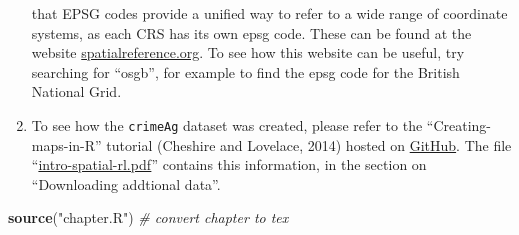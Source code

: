 \documentclass[]{article}
\newenvironment{Shaded}{}{}
\newcommand{\KeywordTok}[1]{\textcolor[rgb]{0.00,0.44,0.13}{\textbf{{#1}}}}
\newcommand{\StringTok}[1]{\textcolor[rgb]{0.25,0.44,0.63}{{#1}}}
\newcommand{\CommentTok}[1]{\textcolor[rgb]{0.38,0.63,0.69}{\textit{{#1}}}}
\newcommand{\NormalTok}[1]{{#1}}
\begin{document}
\begin{enumerate}[1.]
  that EPSG codes provide a unified way to refer to a wide range of
  coordinate systems, as each CRS has its own epsg code. These can be
  found at the website
  \href{http://spatialreference.org/}{spatialreference.org}. To see how
  this website can be useful, try searching for ``osgb'', for example to
  find the epsg code for the British National Grid.
\item
  To see how the \texttt{crimeAg} dataset was created, please refer to
  the ``Creating-maps-in-R'' tutorial (Cheshire and Lovelace, 2014)
  hosted on
  \href{https://github.com/Robinlovelace/Creating-maps-in-R}{GitHub}.
  The file
  ``\href{https://github.com/Robinlovelace/Creating-maps-in-R/blob/master/intro-spatial-rl.pdf}{intro-spatial-rl.pdf}''
  contains this information, in the section on ``Downloading addtional
  data''.
\end{enumerate}
\begin{Shaded}
\begin{Highlighting}[]
\KeywordTok{source}\NormalTok{(}\StringTok{"chapter.R"}\NormalTok{)  }\CommentTok{# convert chapter to tex}
\end{Highlighting}
\end{Shaded}
\end{document}
